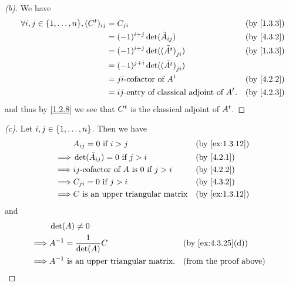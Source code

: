 \begin{proof}[(b)]
  We have
  \begin{align*}
    \forall i, j \in \set{1, \dots, n}, (\tp{C})_{i j} & = C_{j i}                                           &  & \text{(by \cref{1.3.3})} \\
                                                       & = (-1)^{i + j} \det(\tilde{A}_{i j})                &  & \text{(by \cref{4.3.2})} \\
                                                       & = (-1)^{i + j} \det(\tilde{(\tp{A})}_{j i})         &  & \text{(by \cref{1.3.3})} \\
                                                       & = (-1)^{j + i} \det(\tilde{(\tp{A})}_{j i})                                       \\
                                                       & = j i\text{-cofactor of } \tp{A}                    &  & \text{(by \cref{4.2.2})} \\
                                                       & = i j\text{-entry of classical adjoint of } \tp{A}. &  & \text{(by \cref{4.2.3})}
  \end{align*}
  and thus by \cref{1.2.8} we see that \({C}^{t}\) is the classical adjoint of \({A}^{t}\).
\end{proof}

\begin{proof}[(c)]
  Let \(i, j \in \left\lbrace1, \dots, n\right\rbrace\).
  Then we have
  \begin{align*}
             & A_{i j} = 0 \text{ if } i > j                             &  & \text{(by \cref{ex:1.3.12})} \\
    \implies & \det(\tilde{A}_{i j}) = 0 \text{ if } j > i               &  & \text{(by \cref{4.2.1})}     \\
    \implies & i j\text{-cofactor of } A \text{ is } 0 \text{ if } j > i &  & \text{(by \cref{4.2.2})}     \\
    \implies & C_{j i} = 0 \text{ if } j > i                             &  & \text{(by \cref{4.3.2})}     \\
    \implies & C \text{ is an upper triangular matrix}                   &  & \text{(by \cref{ex:1.3.12})}
  \end{align*}
  and
  \begin{align*}
             & \det(A) \neq 0                                                                     \\
    \implies & A^{-1} = \frac{1}{\det(A)} C                  &  & \text{(by \cref{ex:4.3.25}(d))} \\
    \implies & A^{-1} \text{ is an upper triangular matrix}. &  & \text{(from the proof above)}
  \end{align*}
\end{proof}

